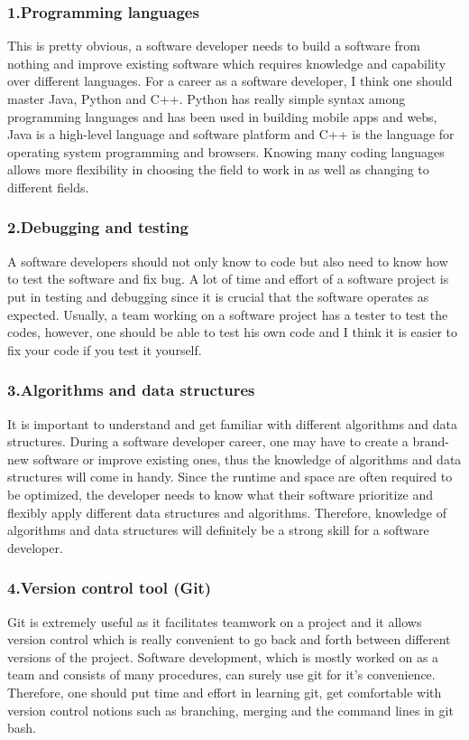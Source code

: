 \documentclass[a4paper, 11pt]{report}
\begin{document}
	\subsubsection{1.Programming languages}
	This is pretty obvious, a software developer needs to build a software from nothing and improve existing software which requires knowledge and capability over different languages. For a career as a software developer, I think one should master Java, Python and C++. Python has really simple syntax among programming languages and has been used in building mobile apps and webs, Java is a high-level language and software platform and C++ is the language for operating system programming and browsers\cite{ky1}. Knowing many coding languages allows more flexibility in choosing the field to work in as well as changing to different fields.
	\subsubsection{2.Debugging and testing}
	A software developers should not only know to code but also need to know how to test the software and fix bug. A lot of time and effort of a software project is put in testing and debugging since it is crucial that the software operates as expected. Usually, a team working on a software project has a tester to test the codes, however, one should be able to test his own code and I think it is easier to fix your code if you test it yourself. \cite{ky2}
	\subsubsection{3.Algorithms and data structures}
	It is important to understand and get familiar with different algorithms and data structures. During a software developer career, one may have to create a brand-new software or improve existing ones, thus the knowledge of algorithms and data structures will come in handy. Since the runtime and space are often required to be optimized, the developer needs to know what their software prioritize and flexibly apply different data structures and algorithms. Therefore, knowledge of algorithms and data structures will definitely be a strong skill for a software developer.
	\subsubsection{4.Version control tool (Git)} 
	Git is extremely useful as it facilitates teamwork on a project and it allows version control which is really convenient to go back and forth between different versions of the project. Software development, which is mostly worked on as a team and consists of many procedures, can surely use git for it’s convenience. Therefore, one should put time and effort in learning git, get comfortable with version control notions such as branching, merging and the command lines in git bash.
\end{document}
